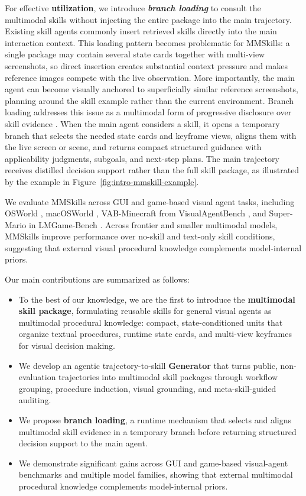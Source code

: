 \documentclass{llmxive}
\begin{document}
For effective \textbf{utilization}, we introduce \textit{\textbf{branch loading}} to consult the multimodal skills without injecting the entire package into the main trajectory. Existing skill agents commonly insert retrieved skills directly into the main interaction context. This loading pattern becomes problematic for MMSkills: a single package may contain several state cards together with multi-view screenshots, so direct insertion creates substantial context pressure and makes reference images compete with the live observation. More importantly, the main agent can become visually anchored to superficially similar reference screenshots, planning around the skill example rather than the current environment. Branch loading addresses this issue as a multimodal form of progressive disclosure over skill evidence \citep{xu2026agentskills}. When the main agent considers a skill, it opens a temporary branch that selects the needed state cards and keyframe views, aligns them with the live screen or scene, and returns compact structured guidance with applicability judgments, subgoals, and next-step plans. The main trajectory receives distilled decision support rather than the full skill package, as illustrated by the example in Figure~\ref{fig:intro-mmskill-example}.

We evaluate MMSkills across GUI and game-based visual agent tasks, including OSWorld \citep{xie2024osworld}, macOSWorld \citep{yang2025macosworld}, VAB-Minecraft from VisualAgentBench \citep{liu2024visualagentbench}, and Super-Mario in LMGame-Bench \citep{hu2025lmgamebenchgoodllmsplaying}. Across frontier and smaller multimodal models, MMSkills improve performance over no-skill and text-only skill conditions, suggesting that external visual procedural knowledge complements model-internal priors.

Our main contributions are summarized as follows:
\begin{itemize}[leftmargin=*]
    \item To the best of our knowledge, we are the first to introduce the \textbf{multimodal skill package}, formulating reusable skills for general visual agents as multimodal procedural knowledge: compact, state-conditioned units that organize textual procedures, runtime state cards, and multi-view keyframes for visual decision making.
    \item We develop an agentic trajectory-to-skill \textbf{Generator} that turns public, non-evaluation trajectories into multimodal skill packages through workflow grouping, procedure induction, visual grounding, and meta-skill-guided auditing.
    \item We propose \textbf{branch loading}, a runtime mechanism that selects and aligns multimodal skill evidence in a temporary branch before returning structured decision support to the main agent.
    \item We demonstrate significant gains across GUI and game-based visual-agent benchmarks and multiple model families, showing that external multimodal procedural knowledge complements model-internal priors.
\end{itemize}
\end{document}
